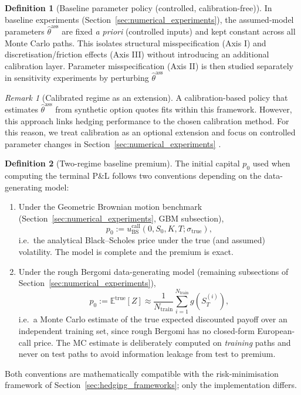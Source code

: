 \documentclass[12pt,a4paper]{article}
\theoremstyle{definition}
\newtheorem{definition}{Definition}[section]
\theoremstyle{plain}
\theoremstyle{remark}
\newtheorem{remark}{Remark}[section]
\theoremstyle{plain}
\begin{document}
\label{subsubsec:delta_calibration_policy}

\begin{definition}[Baseline parameter policy (controlled, calibration-free)]
\label{def:baseline_param_policy}
In baseline experiments (Section~\ref{sec:numerical_experiments}), the assumed-model parameters
$\hat\theta^{\mathrm{ass}}$ are fixed \emph{a priori} (controlled inputs) and kept constant across all Monte Carlo paths.
This isolates structural misspecification (Axis I) and discretisation/friction effects (Axis III) without introducing an additional calibration layer.
Parameter misspecification (Axis II) is then studied separately in sensitivity experiments by perturbing $\hat\theta^{\mathrm{ass}}$ \cite{ElKaroui1998Robustness}
\end{definition}

\begin{remark}[Calibrated regime as an extension]
\label{rem:calibrated_regime_extension}
A calibration-based policy that estimates $\hat\theta^{\mathrm{ass}}$ from synthetic option quotes fits within this framework.
However, this approach links hedging performance to the chosen calibration method.
For this reason, we treat calibration as an optional extension and focus on controlled parameter changes in Section~\ref{sec:numerical_experiments} \cite{ElKaroui1998Robustness}.
\end{remark}

\label{subsubsec:initial_capital_policy}

\begin{definition}[Two-regime baseline premium]\label{def:two_regime_premium}
The initial capital $p_0$ used when computing the terminal P\&L follows two conventions depending on the data-generating model:
\begin{enumerate}
    \item Under the Geometric Brownian motion benchmark (Section~\ref{sec:numerical_experiments}, GBM subsection),
    \[
    p_0 := u_{\mathrm{BS}}^{\mathrm{call}}(0, S_0, K, T; \sigma_{\mathrm{true}}),
    \]
    i.e.\ the analytical Black--Scholes price under the true (and assumed) volatility. The model is complete and the premium is exact.

    \item Under the rough Bergomi data-generating model (remaining subsections of Section~\ref{sec:numerical_experiments}),
    \begin{equation}
    \label{eq:p0_true_price}
    p_0 := \mathbb{E}^{\mathrm{true}}[Z] \approx \frac{1}{N_{\mathrm{train}}} \sum_{i=1}^{N_{\mathrm{train}}} g\!\left(S_T^{(i)}\right),
    \end{equation}
    i.e.\ a Monte Carlo estimate of the true expected discounted payoff over an independent training set, since rough Bergomi has no closed-form European-call price. The MC estimate is deliberately computed on \emph{training} paths and never on test paths to avoid information leakage from test to premium.
\end{enumerate}
Both conventions are mathematically compatible with the risk-minimisation framework of Section~\ref{sec:hedging_frameworks}; only the implementation differs.
\end{definition}
\end{document}
